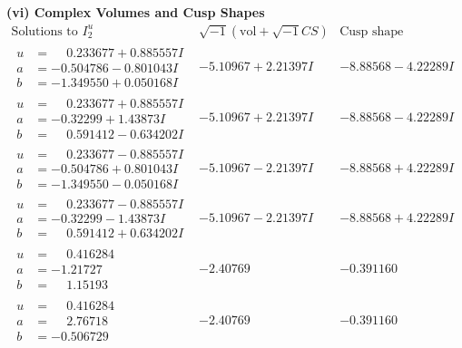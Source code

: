 \documentclass[1p]{elsarticle_modified}
\theoremstyle{definition}
\newcommand{\I}{\sqrt{-1}}
\begin{document}
\newpage\flushleft \textbf{(vi) Complex Volumes and Cusp Shapes}
$$\begin{array}{c|c|c}  
\text{Solutions to }I^u_{2}& \I (\text{vol} + \sqrt{-1}CS) & \text{Cusp shape}\\
 \hline 
\begin{aligned}
u &= \phantom{-}0.233677 + 0.885557 I \\
a &= -0.504786 - 0.801043 I \\
b &= -1.349550 + 0.050168 I\end{aligned}
 & -5.10967 + 2.21397 I & -8.88568 - 4.22289 I \\ \hline\begin{aligned}
u &= \phantom{-}0.233677 + 0.885557 I \\
a &= -0.32299 + 1.43873 I \\
b &= \phantom{-}0.591412 - 0.634202 I\end{aligned}
 & -5.10967 + 2.21397 I & -8.88568 - 4.22289 I \\ \hline\begin{aligned}
u &= \phantom{-}0.233677 - 0.885557 I \\
a &= -0.504786 + 0.801043 I \\
b &= -1.349550 - 0.050168 I\end{aligned}
 & -5.10967 - 2.21397 I & -8.88568 + 4.22289 I \\ \hline\begin{aligned}
u &= \phantom{-}0.233677 - 0.885557 I \\
a &= -0.32299 - 1.43873 I \\
b &= \phantom{-}0.591412 + 0.634202 I\end{aligned}
 & -5.10967 - 2.21397 I & -8.88568 + 4.22289 I \\ \hline\begin{aligned}
u &= \phantom{-}0.416284\phantom{ +0.000000I} \\
a &= -1.21727\phantom{ +0.000000I} \\
b &= \phantom{-}1.15193\phantom{ +0.000000I}\end{aligned}
 & -2.40769\phantom{ +0.000000I} & -0.391160\phantom{ +0.000000I} \\ \hline\begin{aligned}
u &= \phantom{-}0.416284\phantom{ +0.000000I} \\
a &= \phantom{-}2.76718\phantom{ +0.000000I} \\
b &= -0.506729\phantom{ +0.000000I}\end{aligned}
 & -2.40769\phantom{ +0.000000I} & -0.391160\phantom{ +0.000000I} \\ \hline\begin{aligned}

\end{aligned}
\end{array}$$
\end{document}
